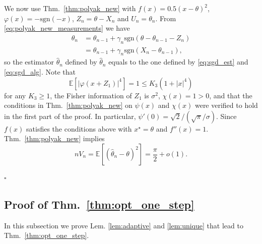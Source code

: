\documentclass[letterpaper, conference,9pt]{IEEEtran}      %
\newcommand{\sgn}{\mathrm{sgn} }
\newcommand*{\QEDA}{\hfill\ensuremath{\square}}
\begin{document}
We now use Thm.~\ref{thm:polyak_new} with $f(x) = 0.5(x-\theta)^2$, $\varphi(x) = -\sgn(-x)$, $Z_n = \theta-X_n$ and $U_n = \theta_n$. From \eqref{eq:polyak_new_measurements} we have
\begin{align*} 
\theta_n & = \theta_{n-1} + \gamma_n \sgn(\theta-\theta_{n-1} - Z_n )  \\
& = \theta_{n-1} + \gamma_n \sgn(X_n-\theta_{n-1} ),
\end{align*}
so the estimator $\widehat{\theta}_n$ defined by $\widehat{\theta}_n$ equals to the one defined by \eqref{eq:sgd_est} and \eqref{eq:sgd_alg}. Note that
\[
\mathbb E \left[ | \varphi(x+Z_1) |^4 \right] = 1 \leq K_3(1+|x|^4)
\]
for any $K_3\geq 1$, the Fisher information of $Z_1$ is $\sigma^2$, $\chi(x) = 1 > 0$, and that 
the conditions in Thm.~\ref{thm:polyak_new} on $\psi(x)$ and $\chi(x)$ were verified to hold in the first part of the proof. In particular, $\psi'(0) = \sqrt{2}/ (\sqrt{\pi}/\sigma)$. Since $f(x)$ satisfies the conditions above with $x^\star = \theta$ and $f''(x) = 1$. Thm.~\ref{thm:polyak_new} implies 
\[
n V_n = \mathbb E \left[ \left(\widehat{\theta}_n-\theta \right)^2 \right]  = \frac{\pi}{2}  + o(1).
\]

 \QEDA


\subsection*{Proof of Thm.~\ref{thm:opt_one_step}}
In this subsection we prove Lem. \ref{lem:adaptive} and \ref{lem:unique} that lead to Thm.~\ref{thm:opt_one_step}. 
\end{document}
